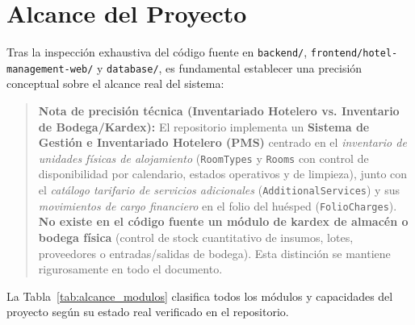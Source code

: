 \documentclass[12pt,a4paper]{article}
\begin{document}
\section{Alcance del Proyecto}

Tras la inspecci\'on exhaustiva del c\'odigo fuente en \texttt{backend/}, \texttt{frontend/hotel-management-web/} y \texttt{database/}, es fundamental establecer una precisi\'on conceptual sobre el alcance real del sistema:

\begin{quote}
\textbf{Nota de precisi\'on t\'ecnica (Inventariado Hotelero vs. Inventario de Bodega/Kardex):} El repositorio implementa un \textbf{Sistema de Gesti\'on e Inventariado Hotelero (PMS)} centrado en el \textit{inventario de unidades f\'isicas de alojamiento} (\texttt{RoomTypes} y \texttt{Rooms} con control de disponibilidad por calendario, estados operativos y de limpieza), junto con el \textit{cat\'alogo tarifario de servicios adicionales} (\texttt{AdditionalServices}) y sus \textit{movimientos de cargo financiero} en el folio del hu\'esped (\texttt{FolioCharges}). \textbf{No existe en el c\'odigo fuente un m\'odulo de kardex de almac\'en o bodega f\'isica} (control de stock cuantitativo de insumos, lotes, proveedores o entradas/salidas de bodega). Esta distinci\'on se mantiene rigurosamente en todo el documento.
\end{quote}

La Tabla~\ref{tab:alcance_modulos} clasifica todos los m\'odulos y capacidades del proyecto seg\'un su estado real verificado en el repositorio.
\end{document}
